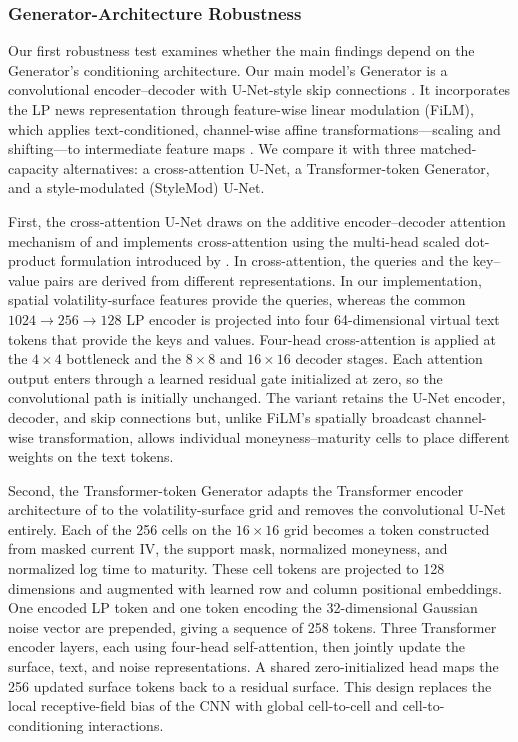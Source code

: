 \providecommand{\rqthreerobustcell}[3]{%
\shortstack{\ensuremath{#1^{{#2}}}\\[-0.2ex]
{\scriptsize\ensuremath{(#3)}}}}


\subsubsection*{Generator-Architecture Robustness}


Our first robustness test examines whether the main findings depend on the
Generator's conditioning architecture. Our main model's Generator is a
convolutional encoder--decoder with U-Net-style skip connections
\citep{ronneberger2015unet}. It incorporates the LP news representation through
feature-wise linear modulation (FiLM), which applies text-conditioned,
channel-wise affine transformations---scaling and shifting---to intermediate
feature maps \citep{perez2018film}. We compare it with three matched-capacity
alternatives: a cross-attention U-Net, a Transformer-token Generator, and a
style-modulated (StyleMod) U-Net.


First, the cross-attention U-Net draws on the additive encoder--decoder
attention mechanism of \citet{bahdanau2015neural} and implements cross-attention
using the multi-head scaled dot-product formulation introduced by
\citet{vaswani2017attention}. In cross-attention, the queries and the key--value
pairs are derived from different representations. In our implementation,
spatial volatility-surface features provide the queries, whereas the common
$1024\rightarrow256\rightarrow128$ LP encoder is projected into four
64-dimensional virtual text tokens that provide the keys and values.
Four-head cross-attention is applied at the $4\times4$ bottleneck and the
$8\times8$ and $16\times16$ decoder stages. Each attention output enters
through a learned residual gate initialized at zero, so the convolutional path
is initially unchanged. The variant retains the U-Net encoder, decoder, and
skip connections but, unlike FiLM's spatially broadcast channel-wise
transformation, allows individual moneyness--maturity cells to place different
weights on the text tokens.


Second, the Transformer-token Generator adapts the Transformer encoder
architecture of \citet{vaswani2017attention} to the volatility-surface grid and
removes the convolutional U-Net entirely. Each of the 256 cells on the
$16\times16$ grid becomes a token constructed from masked current IV, the
support mask, normalized moneyness, and normalized log time to maturity. These
cell tokens are projected to 128 dimensions and augmented with learned row and
column positional embeddings. One encoded LP token and one token encoding the
32-dimensional Gaussian noise vector are prepended, giving a sequence of 258
tokens. Three Transformer encoder layers, each using four-head self-attention,
then jointly update the surface, text, and noise representations. A shared
zero-initialized head maps the 256 updated surface tokens back to a residual
surface. This design replaces the local receptive-field bias of the CNN with
global cell-to-cell and cell-to-conditioning interactions.

